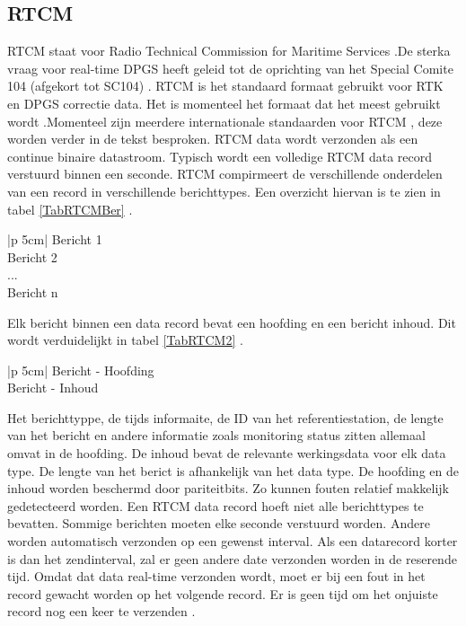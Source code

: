 \subsection{RTCM}
\label{LRTC}
RTCM staat voor Radio Technical Commission for Maritime Services \cite{LBibGLONASS}.De sterka vraag voor real-time DPGS heeft geleid tot de oprichting van het Special Comite 104 (afgekort tot SC104) \cite{LBibRTCM}. RTCM is het standaard formaat gebruikt voor RTK en DPGS correctie data. Het is momenteel het formaat dat het meest gebruikt wordt \cite{LBibRTK3}.Momenteel zijn meerdere internationale standaarden voor RTCM \cite{LBibRTCM}, deze worden verder in de tekst besproken. RTCM data wordt verzonden als een continue binaire datastroom. Typisch wordt een volledige RTCM data record verstuurd binnen een seconde. RTCM compirmeert de verschillende onderdelen van een record in verschillende berichttypes. Een overzicht hiervan is te zien in tabel \ref{TabRTCMBer} \cite{LBibRTCM3}.
\begin{table}[hbp]
	\caption{RTCM record, verdeeld in verschillende berichttypes}		
	\begin{tabular}{|p {5cm}|}	
		\hline
		Bericht 1 \\ \hline
		Bericht 2 \\ \hline
		... \\ \hline
		Bericht n \\ \hline
	\end{tabular}
	\label{TabRTCMBer}
\end{table}
Elk bericht binnen een data record bevat een hoofding en een bericht inhoud. Dit wordt verduidelijkt in tabel \ref{TabRTCM2} \cite{LBibRTCM3}.
\begin{table}[hbp]
	\caption{RTCM bericht, verdeeld in hoofding en bericht}		
	\begin{tabular}{|p {5cm}|}	
		\hline
		Bericht - Hoofding \\ \hline
		Bericht - Inhoud \\ \hline
	\end{tabular}
	\label{TabRTCM2}
\end{table}
Het berichttyppe, de tijds informaite, de ID van het referentiestation, de lengte van het bericht en andere informatie zoals monitoring status zitten allemaal omvat in de hoofding. De inhoud bevat de relevante werkingsdata voor elk data type. De lengte van het berict is afhankelijk van het data type. De hoofding en de inhoud worden beschermd door pariteitbits. Zo kunnen fouten relatief makkelijk gedetecteerd worden. Een RTCM data record hoeft niet alle berichttypes te bevatten. Sommige berichten moeten elke seconde verstuurd worden. Andere worden automatisch verzonden op een gewenst interval. Als een datarecord korter is dan het zendinterval, zal er geen andere date verzonden worden in de reserende tijd. Omdat dat data real-time verzonden wordt, moet er bij een fout in het record gewacht worden op het volgende record. Er is geen tijd om het onjuiste record nog een keer te verzenden \cite{LBibRTCM3}. 

